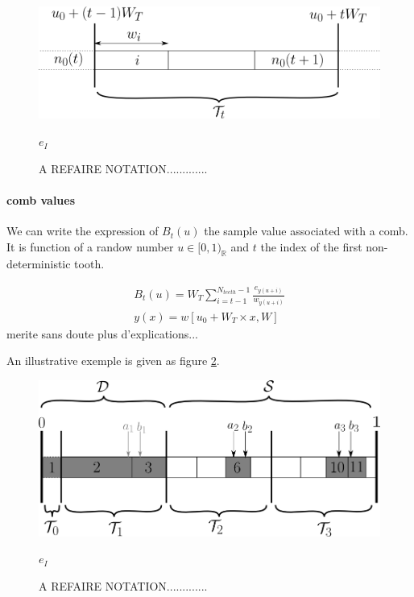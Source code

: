 \documentclass[./thesis.tex]{subfiles}
\begin{document}
 \begin{figure}[h!]
	\begin{center}
		\includegraphics[width=0.9\columnwidth]{figures/pt2/tooththreshold}
		\caption{A REFAIRE NOTATION.............}
		\label{fig:teeth}
		$e_I$
	\end{center}
\end{figure}


\paragraph{comb values}

We can write the expression of $B_t(u)$ the sample value associated with a comb. It is function of a randow number $u \in [0,1)_\mathbb{R}$ and $t$ the index of the first non-deterministic tooth.

\begin{align}
\label{eq:combvalue}
B_t(u) = W_T \sum_{i=t-1}^{N_{teeth}-1} \frac{e_{y(u+i)}}{w_{y(u+i)}} \\
y(x)=w[u_0+ W_T \times x, W]
\end{align}
\alert{merite sans doute plus d'explications...}

An illustrative exemple is given as figure \ref{fig:toothindet}.

 \begin{figure}[h!]
	\begin{center}
		\includegraphics[width=0.9\columnwidth]{figures/pt2/toothindet}
		\caption{A REFAIRE NOTATION.............}
		\label{fig:toothindet}
		$e_I$
	\end{center}
\end{figure}
\end{document}
